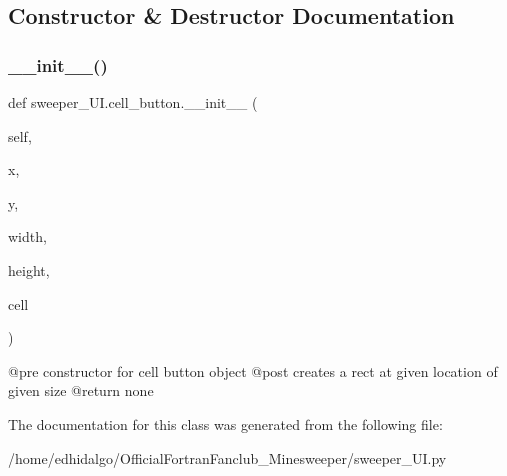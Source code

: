 \subsection{Constructor \& Destructor Documentation}
\mbox{\label{classsweeper___u_i_1_1cell__button_a331ff79c7f93f68d677c7b6aaafbc23a}} 
\subsubsection{\texorpdfstring{\+\_\+\+\_\+init\+\_\+\+\_\+()}{\_\_init\_\_()}}
{\footnotesize\ttfamily def sweeper\+\_\+\+U\+I.\+cell\+\_\+button.\+\_\+\+\_\+init\+\_\+\+\_\+ (\begin{DoxyParamCaption}\item[{}]{self,  }\item[{}]{x,  }\item[{}]{y,  }\item[{}]{width,  }\item[{}]{height,  }\item[{}]{cell }\end{DoxyParamCaption})}

\begin{DoxyVerb}@pre constructor for cell button object
@post creates a rect at given location of given size
@return none
\end{DoxyVerb}
 

The documentation for this class was generated from the following file\+:\begin{DoxyCompactItemize}
\item 
/home/edhidalgo/\+Official\+Fortran\+Fanclub\+\_\+\+Minesweeper/sweeper\+\_\+\+U\+I.\+py\end{DoxyCompactItemize}
